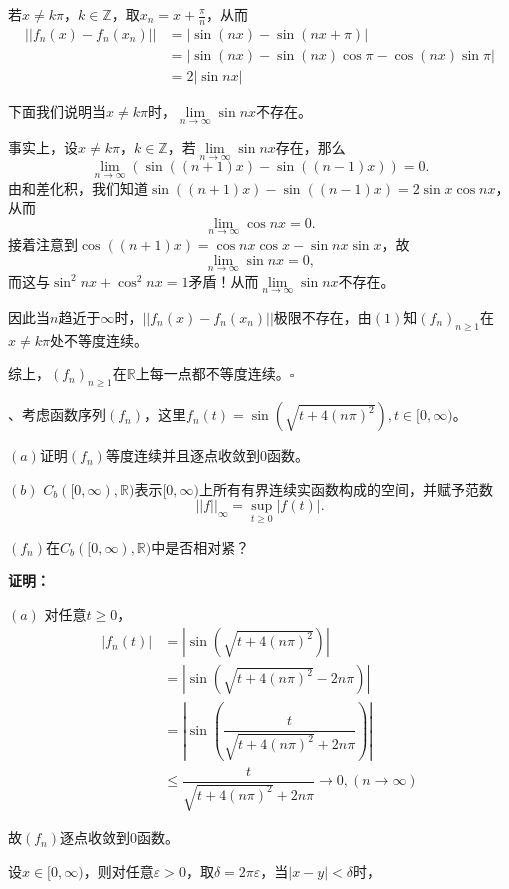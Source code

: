 \documentclass[12pt,fancyhdr,UTF8,openany]{ctexart}
\begin{document}
若$x\not= k\pi$，$k\in\mathbb{Z}$，取$x_n=x+\frac{\pi}{n}$，从而
\[\begin{aligned}
||f_n(x)-f_n(x_n)||&=|\sin (nx)-\sin(nx+\pi)|\\
 &=|\sin (nx)-\sin(nx)\cos\pi-\cos(nx)\sin\pi|\\
                   &=2|\sin nx|
\end{aligned}\]\par 
下面我们说明当$x\not=k\pi$时，$\lim\limits_{n\rightarrow \infty}\sin nx$不存在。\par 
事实上，设$x\not=k\pi$，$k\in\mathbb{Z}$，若$\lim\limits_{n\rightarrow \infty} \sin nx$存在，那么
\[\lim\limits_{n\rightarrow \infty} (\sin((n+1)x)-\sin((n-1)x))=0.\]
由和差化积，我们知道$\sin((n+1)x)-\sin((n-1)x)=2\sin x\cos nx$，从而
\[\lim\limits_{n\rightarrow \infty} \cos nx=0.\]
接着注意到$\cos((n+1)x)=\cos nx\cos x-\sin nx\sin x$，故\[\lim\limits_{n\rightarrow \infty} \sin nx =0,\]而这与$\sin^2 nx+\cos^2 nx=1$矛盾！从而$\lim\limits_{n\rightarrow \infty} \sin nx$不存在。\par 
因此当$n$趋近于$\infty$时，$||f_n(x)-f_n(x_n)||$极限不存在，由$(1)$知$(f_n)_{n\geqslant 1}$在$x\not= k\pi$处不等度连续。\par 综上，$(f_n)_{n\geqslant 1}$在$\mathbb{R}$上每一点都不等度连续。$\square$\par 
\newpage
{}、考虑函数序列$(f_n)$，这里$f_n(t)=\sin(\sqrt{t+4(n\pi)^2}),t\in[0,\infty)$。\par 
$(a)$证明$(f_n)$等度连续并且逐点收敛到$0$函数。\par 
$(b)$ $C_b([0,\infty),\mathbb{R})$表示$[0,\infty)$上所有有界连续实函数构成的空间，并赋予范数
\[ ||f||_\infty=\sup_{t\geqslant 0}|f(t)|.\]\par 
$(f_n)$在$C_b([0,\infty),\mathbb{R})$中是否相对紧？\par 
\textbf{证明：}\par 
$(a)$ 对任意$t\geqslant 0$，
\[\begin{aligned}
	|f_n(t)|&=|\sin(\sqrt{t+4(n\pi)^2})|\\
	        &=|\sin(\sqrt{t+4(n\pi)^2}-2n\pi)|\\
	        &=|\sin(\dfrac{t}{\sqrt{t+4(n\pi)^2}+2n\pi})|\\
	        &\leqslant \dfrac{t}{\sqrt{t+4(n\pi)^2}+2n\pi}\rightarrow 0,(n\rightarrow \infty)
\end{aligned}\]\par 
故$(f_n)$逐点收敛到0函数。\par 
设$x\in[0,\infty)$，则对任意$\varepsilon>0$，取$\delta=2\pi\varepsilon$，当$|x-y|<\delta$时，
\end{document}
